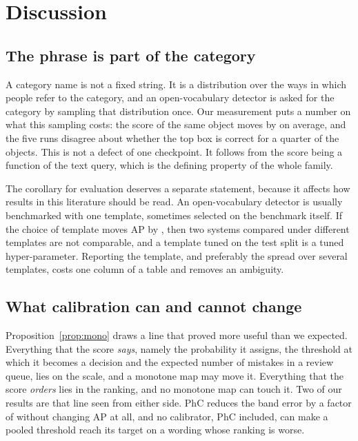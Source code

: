 \section{Discussion}\label{sec:discussion}

\subsection{The phrase is part of the category}

A category name is not a fixed string. It is a distribution over the ways in which people refer
to the category, and an open-vocabulary detector is asked for the category by sampling that
distribution once. Our measurement puts a number on what this sampling costs: the score of the
same object moves by \SPREADPTS{} on average, and the five runs disagree about whether the top box
is correct for a quarter of the objects. This is not a defect of one checkpoint. It follows from
the score being a function of the text query, which is the defining property of the whole family.

The corollary for evaluation deserves a separate statement, because it affects how results in this
literature should be read. An open-vocabulary detector is usually benchmarked with one template,
sometimes selected on the benchmark itself. If the choice of template moves AP by \APGAP, then two
systems compared under different templates are not comparable, and a template tuned on the test
split is a tuned hyper-parameter. Reporting the template, and preferably the spread over several
templates, costs one column of a table and removes an ambiguity.

\subsection{What calibration can and cannot change}

Proposition~\ref{prop:mono} draws a line that proved more useful than we expected. Everything that
the score \emph{says}, namely the probability it assigns, the threshold at which it becomes a
decision and the expected number of mistakes in a review queue, lies on the scale, and a monotone
map may move it. Everything that the score \emph{orders} lies in the ranking, and no monotone map
can touch it. Two of our results are that line seen from either side. PhC reduces the band error
by a factor of \FACTOR{} without changing AP at all, and no calibrator, PhC included, can make a
pooled threshold reach its target on a wording whose ranking is worse.

